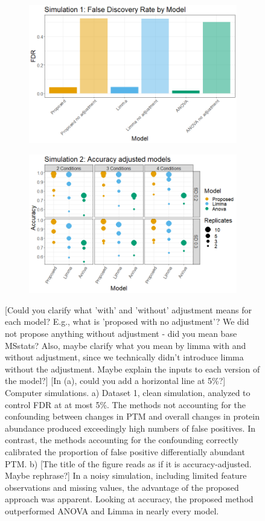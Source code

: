 \documentclass[mcp]{article}
\numberwithin{table}{section}
\def\todo#1{{\color{red}[#1]}}
\begin{document}
\begin{figure}[ht]
\centering
\begin{subfigure}[c]{0.7\linewidth}
\includegraphics[width=1\textwidth]{images/sim1_FDR_all_models.png}
\caption{}
\label{fig:sim1_fdr}
\end{subfigure}
\begin{subfigure}[c]{0.825\linewidth}
\includegraphics[width=1\textwidth]{images/sim3_Accuracy.png}
\caption{}
\label{fig:sim2_acc}
\end{subfigure}
\caption{\todo{Could you clarify what 'with' and 'without' adjustment means for each model? E.g., what is 'proposed with no adjustment'? We did not propose anything without adjustment - did you mean base MSstats? Also, maybe clarify what you mean by limma with and without adjustment, since we technically didn't introduce limma without the adjustment. Maybe explain the inputs to each version of the model?} \todo{In (a), could you add a horizontal line at 5\%?} Computer simulations. a) Dataset 1, clean simulation, analyzed to control FDR at at most 5\%. The methods not accounting for the confounding between changes in PTM and overall changes in protein abundance produced exceedingly high numbers of false positives. In contrast, the methods accounting for the confounding correctly calibrated the proportion of false positive differentially abundant PTM.  b)  \todo{The title of the figure reads as if it is accuracy-adjusted. Maybe rephrase?} In a noisy simulation, including limited feature observations and missing values, the advantage of the proposed approach was apparent. Looking at accuracy, the proposed method outperformed ANOVA and Limma in nearly every model.
}
\end{figure}
\end{document}
